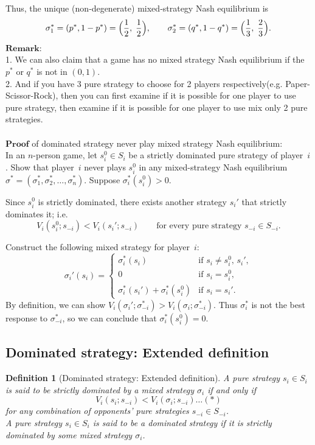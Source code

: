 \documentclass[twoside]{article}
\theoremstyle{definitionstyle}
\newtheorem*{definition}{Definition}
\begin{document}
Thus, the unique (non‑degenerate) mixed‑strategy Nash equilibrium is
\[
\sigma_1^* = (p^*, 1-p^*) = \Bigl(\frac{1}{2},\; \frac{1}{2}\Bigr), \qquad
\sigma_2^* = (q^*, 1-q^*) = \Bigl(\frac{1}{3},\; \frac{2}{3}\Bigr).
\]
$\textbf{Remark:}$\\
1. We can also claim that a game has no mixed strategy Nash equilibrium if the $p^*$ or $q^*$ is not in $(0,1)$. \\
2. And if you have 3 pure strategy to choose for 2 players respectively(e.g. Paper-Scissor-Rock), then you can first examine if it is possible for one player to use pure strategy, then examine if it is possible for one player to use mix only 2 pure strategies.\\
\\
$\textbf{Proof}$ of dominated strategy never play mixed strategy Nash equilibrium:\\
In an \(n\)-person game, let \(s_i^0 \in S_i\) be a strictly dominated pure strategy of player~\(i\). Show that player~\(i\) never plays \(s_i^0\) in any mixed-strategy Nash equilibrium \(\sigma^* = (\sigma_1^*, \sigma_2^*, \dots, \sigma_n^*)\). Suppose $\sigma_i^*(s_i^0) > 0$.


Since \(s_i^0\) is strictly dominated, there exists another strategy \(s_i'\) that strictly dominates it; i.e.
\[
V_i(s_i^0; s_{-i}) < V_i(s_i'; s_{-i}) \qquad \text{for every pure strategy } s_{-i} \in S_{-i}.
\]

Construct the following mixed strategy for player~\(i\):
\[
\sigma_i'(s_i) =
\begin{cases}
\sigma_i^*(s_i) & \text{if } s_i \neq s_i^0,\, s_i',\\[1mm]
0 & \text{if } s_i = s_i^0,\\[1mm]
\sigma_i^*(s_i') + \sigma_i^*(s_i^0) & \text{if } s_i = s_i'.
\end{cases}
\]
By definition, we can show $V_i(\sigma_i'; \sigma_{-i}^*) > V_i(\sigma_i; \sigma_{-i}^*)$. Thus $\sigma_i^*$ is not the best response to $\sigma_{-i}^*$, so we can conclude that $\sigma_i^*(s_i^0) = 0$.
%
%
%
%
%
\subsection{Dominated strategy: Extended definition}
\begin{definition}[Dominated strategy: Extended definition]
   A pure strategy $s_i\in S_i$ is said to be strictly dominated by a mixed strategy $\sigma_i$ if and only if 
$$V_i(s_i;s_{-i}) < V_i(\sigma_i;s_{-i})\dots(*)$$
for any combination of opponents' pure strategies $s_{-i}\in S_{-i}$. \\
A pure strategy $s_i\in S_i$ is said to be a dominated strategy if it is strictly 
dominated by some mixed strategy $\sigma_i$. 
\end{definition}
\end{document}

